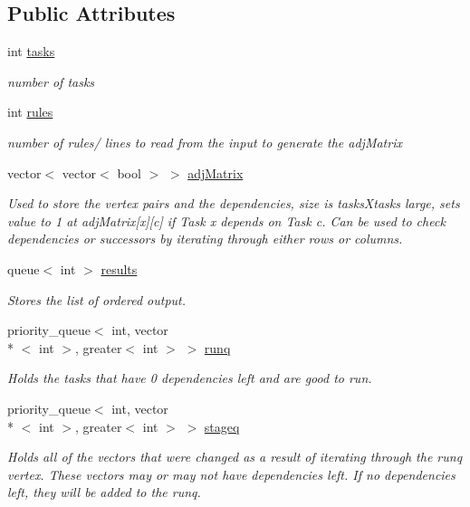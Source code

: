 \subsection*{Public Attributes}
\begin{DoxyCompactItemize}
\item 
int \hyperlink{structGraph_a4d2a4b0944a121f0415137f0f1538e4a}{tasks}
\begin{DoxyCompactList}\small\item\em number of tasks \end{DoxyCompactList}\item 
int \hyperlink{structGraph_a7d540d84c08510deb0f2b0692ed5afcd}{rules}
\begin{DoxyCompactList}\small\item\em number of rules/ lines to read from the input to generate the adj\-Matrix \end{DoxyCompactList}\item 
vector$<$ vector$<$ bool $>$ $>$ \hyperlink{structGraph_a25439b7cad72199504e1fdd1fbe70130}{adj\-Matrix}
\begin{DoxyCompactList}\small\item\em Used to store the vertex pairs and the dependencies, size is tasks\-Xtasks large, sets value to 1 at adj\-Matrix\mbox{[}x\mbox{]}\mbox{[}c\mbox{]} if Task x depends on Task c. Can be used to check dependencies or successors by iterating through either rows or columns. \end{DoxyCompactList}\item 
queue$<$ int $>$ \hyperlink{structGraph_a97da3b3f97afbd334c70b354a3be4551}{results}
\begin{DoxyCompactList}\small\item\em Stores the list of ordered output. \end{DoxyCompactList}\item 
priority\-\_\-queue$<$ int, vector\\*
$<$ int $>$, greater$<$ int $>$ $>$ \hyperlink{structGraph_af6491f1c520f1cbff611984f0da0167a}{runq}
\begin{DoxyCompactList}\small\item\em Holds the tasks that have 0 dependencies left and are good to run. \end{DoxyCompactList}\item 
priority\-\_\-queue$<$ int, vector\\*
$<$ int $>$, greater$<$ int $>$ $>$ \hyperlink{structGraph_a8e75929d511a2d1808f89b7a899c6f12}{stageq}
\begin{DoxyCompactList}\small\item\em Holds all of the vectors that were changed as a result of iterating through the runq vertex. These vectors may or may not have dependencies left. If no dependencies left, they will be added to the runq. \end{DoxyCompactList}\item 

\end{DoxyCompactItemize}
